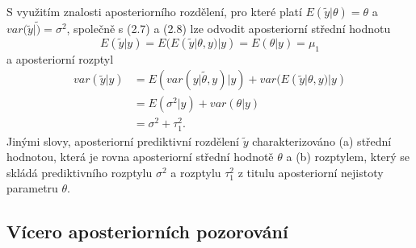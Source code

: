 S využitím znalosti aposteriorního rozdělení, pro které platí $E(\tilde{y} | \theta) = \theta$ a $var(\tilde{y} | \tilde) = \sigma^2$, společně s (2.7) a (2.8) lze odvodit aposteriorní střední hodnotu
\begin{equation}
E(\tilde{y} | y) = E(E(\tilde{y} | \theta, y) | y) = E(\theta | y) = \mu_1
\end{equation}
a aposteriorní rozptyl
\begin{equation}
\begin{split}
var(\tilde{y} | y) & = E(var(\tilde{y | \theta, y}) | y ) + var(E(\tilde{y} | \theta, y) | y)\\
 & = E(\sigma^2 | y ) + var(\theta | y)\\
 & = \sigma^2 + \tau_1^2.
\end{split}
\end{equation}
Jinými slovy, aposteriorní prediktivní rozdělení $\tilde{y}$ charakterizováno (a) střední hodnotou, která je rovna aposteriorní střední hodnotě $\theta$ a (b) rozptylem, který se skládá prediktivního rozptylu $\sigma^2$ a rozptylu $\tau_1^2$ z titulu aposteriorní nejistoty parametru $\theta$.

\subsection{Vícero aposteriorních pozorování}

